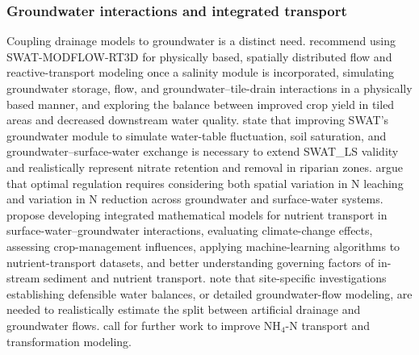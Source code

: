 \subsubsection{Groundwater interactions and integrated transport}
Coupling drainage models to groundwater is a distinct need. \textcite{Addab2022} recommend using SWAT-MODFLOW-RT3D for physically based, spatially distributed flow and reactive-transport modeling once a salinity module is incorporated, simulating groundwater storage, flow, and groundwater--tile-drain interactions in a physically based manner, and exploring the balance between improved crop yield in tiled areas and decreased downstream water quality. \textcite{Hoang2017} state that improving SWAT's groundwater module to simulate water-table fluctuation, soil saturation, and groundwater--surface-water exchange is necessary to extend SWAT\_LS validity and realistically represent nitrate retention and removal in riparian zones. \textcite{Hojberg2017} argue that optimal regulation requires considering both spatial variation in N leaching and variation in N reduction across groundwater and surface-water systems. \textcite{Elsayed2023} propose developing integrated mathematical models for nutrient transport in surface-water--groundwater interactions, evaluating climate-change effects, assessing crop-management influences, applying machine-learning algorithms to nutrient-transport datasets, and better understanding governing factors of in-stream sediment and nutrient transport. \textcite{Barkle2021} note that site-specific investigations establishing defensible water balances, or detailed groundwater-flow modeling, are needed to realistically estimate the split between artificial drainage and groundwater flows. \textcite{Yang2008} call for further work to improve NH$_4$-N transport and transformation modeling.

